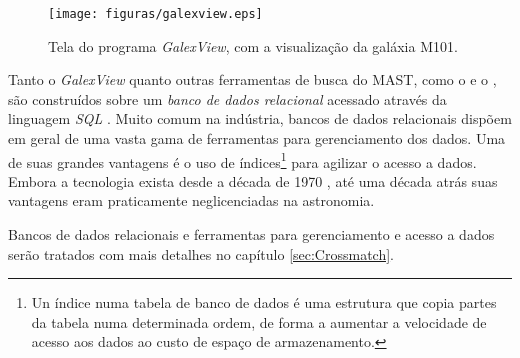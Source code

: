\begin{figure}
	\texttt{[image: figuras/galexview.eps]}
	\caption[Tela do programa{\em GalexView}.]
	{Tela do programa {\em GalexView}, com a visualização da galáxia M101.}
	\label{fig:GalexView}
\end{figure}

Tanto o {\em GalexView} quanto outras ferramentas de busca do MAST, como o
 e o , são construídos sobre um
{\em banco de dados relacional} acessado através da linguagem {\em SQL}
\citep{Chamberlin1974}. Muito comum na indústria, bancos de dados relacionais
dispõem em geral de uma vasta gama de ferramentas para gerenciamento dos dados.
Uma de suas grandes vantagens é o uso de índices\footnote{Un índice numa tabela
de banco de dados é uma estrutura que copia partes da tabela numa determinada
ordem, de forma a aumentar a velocidade de acesso aos dados ao custo de espaço
de armazenamento.} para agilizar o acesso a dados. Embora a tecnologia exista
desde a década de 1970 \citep{Codd1970}, até uma década atrás suas vantagens
eram praticamente neglicenciadas na astronomia.

Bancos de dados relacionais e ferramentas para gerenciamento e acesso a dados
serão tratados com mais detalhes no capítulo \ref{sec:Crossmatch}.


